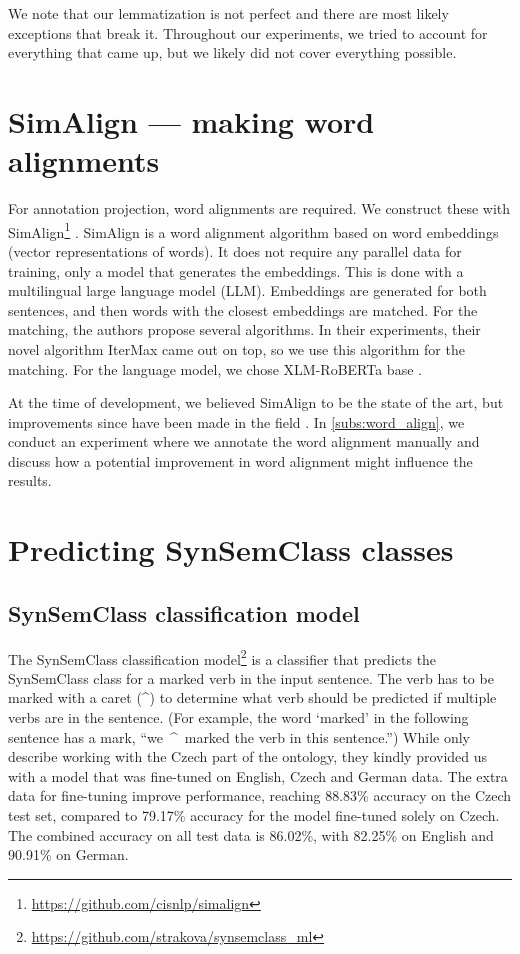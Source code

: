 We note that our lemmatization is not perfect and there are most likely exceptions that break it. Throughout our experiments, we tried to account for everything that came up, but we likely did not cover everything possible.


\section{SimAlign --- making word alignments}
\label{section:simalign}

For annotation projection, word alignments are required. We construct these with SimAlign\footnote{\url{https://github.com/cisnlp/simalign}} \parencite{jalili-sabet-etal-2020-simalign}. SimAlign is a word alignment algorithm based on word embeddings (vector representations of words). It does not require any parallel data for training, only a model that generates the embeddings. This is done with a multilingual large language model (LLM). Embeddings are generated for both sentences, and then words with the closest embeddings are matched. For the matching, the authors propose several algorithms. In their experiments, their novel algorithm IterMax came out on top, so we use this algorithm for the matching. For the language model, we chose XLM-RoBERTa base \parencite{xlmr}. 

At the time of development, we believed SimAlign to be the state of the art, but improvements since have been made in the field \parencite{lai-etal-2022-cross, dou2021word}. In \cref{subs:word_align}, we conduct an experiment where we annotate the word alignment manually and discuss how a potential improvement in word alignment might influence the results.

\section{Predicting SynSemClass classes}

\subsection{SynSemClass classification model}
\label{sec:ssc_pred}

The SynSemClass classification model\footnote{\url{https://github.com/strakova/synsemclass_ml}} \parencite{SSC_LLM_Suggestions} is a classifier
that predicts the SynSemClass class for a marked verb in the input sentence. The verb has to be marked with a caret (\textasciicircum) to determine what verb should be predicted if multiple verbs are in the sentence. (For example, the word `marked' in the following sentence has a mark, ``\mbox{we \textasciicircum{ }marked} the verb in this sentence.'') While \citet{SSC_LLM_Suggestions} only describe working with the Czech part of the ontology, they kindly provided us with a model that was fine-tuned on English, Czech and German data. The extra data for fine-tuning improve performance, reaching 88.83\% accuracy on the Czech test set, compared to 79.17\% accuracy for the model fine-tuned solely on Czech. The combined accuracy on all test data is 86.02\%, with 82.25\% on English and 90.91\% on German.

